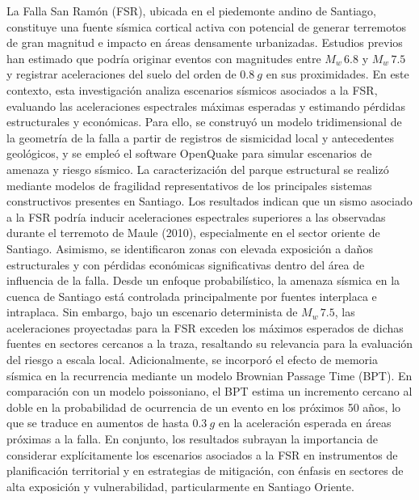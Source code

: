 \documentclass[
	spanish, %
	letterpaper, oneside
]{book}
\newcommand{\Mw}{\ensuremath{M_w}}
\begin{document}
\templatePortrait

\templatePagecfg

\begin{abstractd}

La Falla San Ramón (FSR), ubicada en el piedemonte andino de Santiago, constituye una fuente sísmica cortical activa con potencial de generar terremotos de gran magnitud e impacto en áreas densamente urbanizadas. Estudios previos han estimado que podría originar eventos con magnitudes entre \(\Mw{}\,6.8\) y \(\Mw{}\,7.5\) y registrar aceleraciones del suelo del orden de \(0.8~g\) en sus proximidades. En este contexto, esta investigación analiza escenarios sísmicos asociados a la FSR, evaluando las aceleraciones espectrales máximas esperadas y estimando pérdidas estructurales y económicas. Para ello, se construyó un modelo tridimensional de la geometría de la falla a partir de registros de sismicidad local y antecedentes geológicos, y se empleó el software OpenQuake para simular escenarios de amenaza y riesgo sísmico. La caracterización del parque estructural se realizó mediante modelos de fragilidad representativos de los principales sistemas constructivos presentes en Santiago. Los resultados indican que un sismo asociado a la FSR podría inducir aceleraciones espectrales superiores a las observadas durante el terremoto de Maule (2010), especialmente en el sector oriente de Santiago. Asimismo, se identificaron zonas con elevada exposición a daños estructurales y con pérdidas económicas significativas dentro del área de influencia de la falla. Desde un enfoque probabilístico, la amenaza sísmica en la cuenca de Santiago está controlada principalmente por fuentes interplaca e intraplaca. Sin embargo, bajo un escenario determinista de \(\Mw{}\,7.5\), las aceleraciones proyectadas para la FSR exceden los máximos esperados de dichas fuentes en sectores cercanos a la traza, resaltando su relevancia para la evaluación del riesgo a escala local. Adicionalmente, se incorporó el efecto de memoria sísmica en la recurrencia mediante un modelo Brownian Passage Time (BPT). En comparación con un modelo poissoniano, el BPT estima un incremento cercano al doble en la probabilidad de ocurrencia de un evento en los próximos 50 años, lo que se traduce en aumentos de hasta \(0.3~g\) en la aceleración esperada en áreas próximas a la falla. En conjunto, los resultados subrayan la importancia de considerar explícitamente los escenarios asociados a la FSR en instrumentos de planificación territorial y en estrategias de mitigación, con énfasis en sectores de alta exposición y vulnerabilidad, particularmente en Santiago Oriente.

\end{abstractd}
\end{document}

